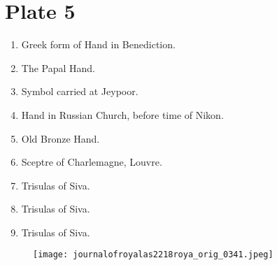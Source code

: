 \documentclass[a4paper, 11pt, oneside, english]{article}
\begin{document}
\section*{Plate 5}
\begin{enumerate}
    \item Greek form of Hand in Benediction.

    \item The Papal Hand.

    \item Symbol carried at Jeypoor.

    \item Hand in Russian Church, before time of Nikon.

    \item Old Bronze Hand.

    \item Sceptre of Charlemagne, Louvre.

    \item Trisulas of Siva.

    \item Trisulas of Siva.

    \item Trisulas of Siva.
\end{enumerate}
\vspace*{\fill}  
\clearpage
\clearpage
\vspace*{\fill}  
\begin{figure}[H]
\centering
\texttt{[image: journalofroyalas2218roya\_orig\_0341.jpeg]}
\end{figure}
\vspace*{\fill} 
\clearpage
\end{document}

